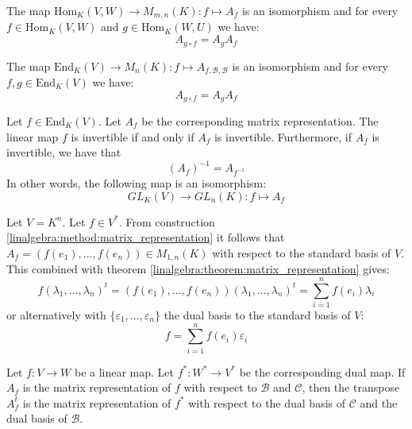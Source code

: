         \begin{theorem}
			\label{linalgebra:theorem:matrix_composition_hom}
            The map $\text{Hom}_K(V,W)\rightarrow M_{m,n}(K):f\mapsto A_f$ is an isomorphism and for every $f\in\text{Hom}_K(V,W)$ and $g\in \text{Hom}_K(W,U)$ we have:
            \begin{equation}
				A_{g\circ f} = A_gA_f
			\end{equation}
		\end{theorem}
        \begin{theorem}
			\label{linalgebra:theorem:matrix_composition_end}
            The map $\text{End}_K(V)\rightarrow M_n(K):f\mapsto A_{f, \mathcal{B}, \mathcal{B}}$ is an isomorphism and for every $f,g\in\text{End}_K(V)$ we have:
            \begin{equation}
				A_{g\circ f} = A_gA_f
			\end{equation}
		\end{theorem}
        \begin{theorem}
			\label{linalgebra:matrix_invertable_map}
            Let $f\in\text{End}_K(V)$. Let $A_f$ be the corresponding matrix representation. The linear map $f$ is invertible if and only if $A_f$ is invertible. Furthermore, if $A_f$ is invertible, we have that \[\left(A_f\right)^{-1} = A_{f^{-1}}\] In other words, the following map is an isomorphism\footnotemark:\[GL_K(V)\rightarrow GL_n(K):f\mapsto A_f\]
		\end{theorem}
        
        \begin{theorem}
			Let $V = K^n$. Let $f\in V^*$. From construction \ref{linalgebra:method:matrix_representation} it follows that $A_f = (f(e_1), ..., f(e_n))\in M_{1,n}(K)$ with respect to the standard basis of $V$. This combined with theorem \ref{linalgebra:theorem:matrix_representation} gives:
            \begin{equation}
				f(\lambda_1, ..., \lambda_n)^t = (f(e_1), ..., f(e_n))(\lambda_1, ..., \lambda_n)^t = \sum_{i=1}^nf(e_i)\lambda_i
			\end{equation}
            or alternatively with $\{\varepsilon_1, ..., \varepsilon_n\}$ the dual basis to the standard basis of $V$:
            \begin{equation}
            	\label{linalgebra:map_in_function_of_dual_basis}
				\boxed{f = \sum_{i=1}^nf(e_i)\varepsilon_i}
			\end{equation}
		\end{theorem}
        \begin{theorem}
			Let $f:V\rightarrow W$ be a linear map. Let $f^*:W^*\rightarrow V^*$ be the corresponding dual map. If $A_f$ is the matrix representation of $f$ with respect to $\mathcal{B}$ and $\mathcal{C}$, then the transpose $A_f^t$ is the matrix representation of $f^*$ with respect to the dual basis of $\mathcal{C}$ and the dual basis of $\mathcal{B}$.
		\end{theorem}
        
